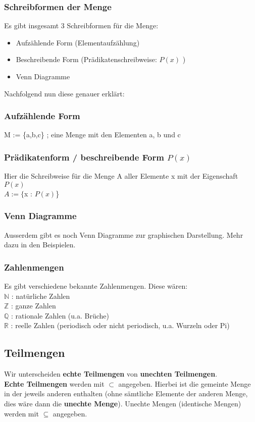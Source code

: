 \documentclass[a4paper,12pt]{article}
\begin{document}
\subsubsection{Schreibformen der Menge}
Es gibt insgesamt 3 Schreibformen für die Menge:
\begin{itemize}
  \item Aufzählende Form (Elementaufzählung)
  \item Beschreibende Form (Prädikatenschreibweise: \( P(x) \) )
  \item Venn Diagramme
\end{itemize}

Nachfolgend nun diese genauer erklärt:

\subsubsection{Aufzählende Form}
M := \{a,b,c\} ; eine Menge mit den Elementen a, b und c

\subsubsection{Prädikatenform / beschreibende Form \( P(x) \)}
Hier die Schreibweise für die Menge A aller Elemente x mit der Eigenschaft \( P(x) \) \\
$A := \{$x : \( P(x) \)\} \\

\subsubsection{Venn Diagramme}
Ausserdem gibt es noch Venn Diagramme zur graphischen Darstellung. Mehr dazu in den Beispielen.

\subsubsection{Zahlenmengen}
Es gibt verschiedene bekannte Zahlenmengen. Diese wären: \\
$\mathbb{N}$ : natürliche Zahlen \\
$\mathbb{Z}$ : ganze Zahlen \\
$\mathbb{Q}$ : rationale Zahlen (u.a. Brüche) \\
$\mathbb{R}$ : reelle Zahlen (periodisch oder nicht periodisch, u.a. Wurzeln oder Pi)

\subsection{Teilmengen}
Wir unterscheiden \textbf{echte Teilmengen} von \textbf{unechten Teilmengen}. \\
\textbf{Echte Teilmengen} werden mit $\subset$ angegeben. Hierbei ist die gemeinte Menge in der jeweils anderen enthalten (ohne \textnormal{sämtliche} Elemente der anderen Menge, dies \textnormal{wäre} dann die \textbf{unechte Menge}). Unechte Mengen (identische Mengen) werden mit $\subseteq$ angegeben.
\end{document}
